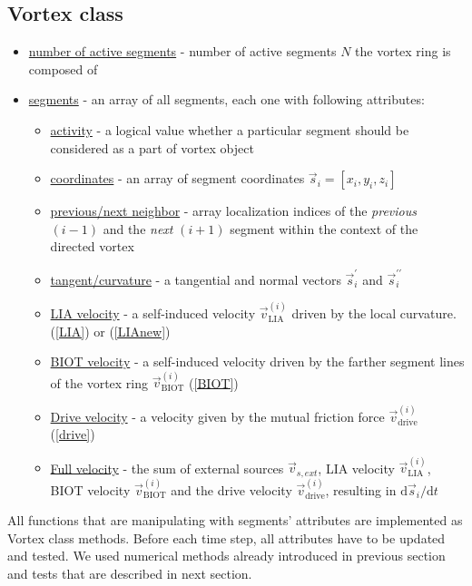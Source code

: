 \subsection*{Vortex class}

\begin{itemize}
	\item \underline{number of active segments} - number of active segments $N$ the vortex ring is composed of
	\item \underline{segments} - an array of all segments, each one with following attributes:
	\begin{itemize}
		\item \underline{activity} - a logical value whether a particular segment should be considered as a part of vortex object
		\item \underline{coordinates} - an array of segment coordinates $\vec{s}_i = [x_i,y_i,z_i]$
		\item \underline{previous/next neighbor} - array localization indices of the \textit{previous} $(i-1)$ and the \textit{next} $(i+1)$ segment within the context of the directed vortex
		\item \underline{tangent/curvature} - a tangential and normal vectors $\vec{s}^{\prime}_i$ and $\vec{s}^{\prime\prime}_i$

		\item \underline{LIA velocity} - a self-induced velocity $\vec{v}_{\text{LIA}}^{(i)}$ driven by the local curvature. (\ref{LIA}) or (\ref{LIAnew})
		\item \underline{BIOT velocity} - a self-induced velocity driven by the farther segment lines of the vortex ring $\vec{v}_{\text{BIOT}}^{(i)}$ (\ref{BIOT})

		\item \underline{Drive velocity} - a velocity given by the mutual friction force $\vec{v}_{\text{drive}}^{(i)}$ (\ref{drive})
		\item \underline{Full velocity} - the sum of external sources $\vec{v}_{s,ext}$, LIA velocity $\vec{v}_{\text{LIA}}^{(i)}$, BIOT velocity $\vec{v}_{\text{BIOT}}^{(i)}$ and the drive velocity $\vec{v}_{\text{drive}}^{(i)}$, resulting in $\text{d}\vec{s}_i / \text{d}t$
	\end{itemize}
\end{itemize}

All functions that are manipulating with segments' attributes are implemented as Vortex class methods. Before each time step, all attributes have to be updated and tested. We used numerical methods already introduced in previous section and tests that are described in next section.

